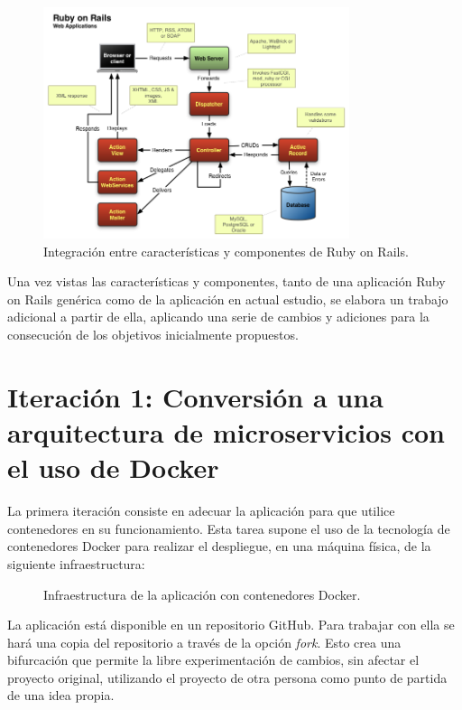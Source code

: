\begin{figure}[H]
\centering
\includegraphics[width=0.8\textwidth]{images/figures/rubyonrails.png}
\caption{Integración entre características y componentes de Ruby on Rails.}
\end{figure}

Una vez vistas las características y componentes, tanto de una aplicación Ruby on Rails genérica como de la aplicación en actual estudio, se elabora un trabajo adicional a partir de ella, aplicando una serie de cambios y adiciones para la consecución de los objetivos inicialmente propuestos.

\section[Iteración 1: Arquitectura de microservicios]{Iteración 1: Conversión a una arquitectura de microservicios con el uso de Docker}

La primera iteración consiste en adecuar la aplicación para que utilice contenedores en su funcionamiento. Esta tarea supone el uso de la tecnología de contenedores Docker para realizar el despliegue, en una máquina física, de la siguiente infraestructura:

\begin{figure}[H]
\caption{Infraestructura de la aplicación con contenedores Docker.\label{fig:figure_docker_microservices}}
\end{figure}

La aplicación  está disponible en un repositorio GitHub. Para trabajar con ella se hará una copia del repositorio a través de la opción \textit{fork}. Esto crea una bifurcación que permite la libre experimentación de cambios, sin afectar el proyecto original, utilizando el proyecto de otra persona como punto de partida de una idea propia.

